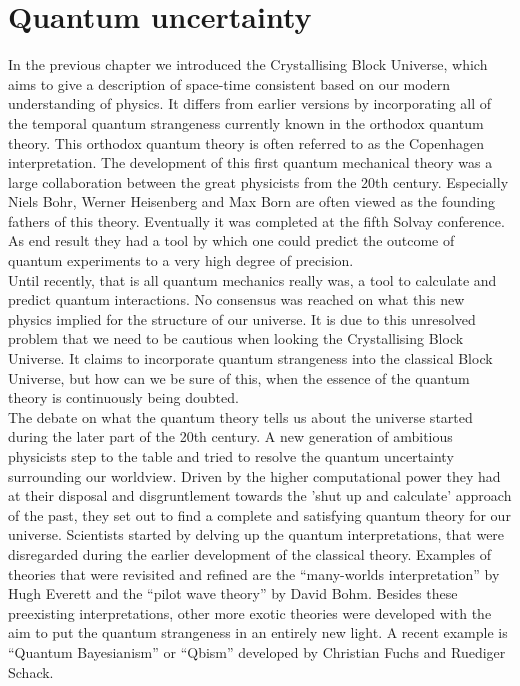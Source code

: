 \documentclass[11pt, a4 paper]{article}
\begin{document}
\section{Quantum uncertainty}
\begin{multicols}{2}
In the previous chapter we introduced the Crystallising Block Universe, which aims to give a description of space-time consistent based on our modern understanding of physics. It differs from earlier versions by incorporating all of the temporal quantum strangeness currently known in the orthodox quantum theory. This orthodox quantum theory is often referred to as the Copenhagen interpretation. The development of this first quantum mechanical theory was a large collaboration between the great physicists from the 20th century. Especially Niels Bohr, Werner Heisenberg and Max Born are often viewed as the founding fathers of this theory. Eventually it was completed at the fifth Solvay conference\cite{history}. As end result they had a tool by which one could predict the outcome of quantum experiments to a very high degree of precision.\\
Until recently, that is all quantum mechanics really was, a tool to calculate and predict quantum interactions. No consensus was reached on what this new physics implied for the structure of our universe. It is due to this unresolved problem that we need to be cautious when looking the Crystallising Block Universe. It claims to incorporate quantum strangeness into the classical Block Universe, but how can we be sure of this, when the essence of the quantum theory is continuously being doubted.\\
The debate on what the quantum theory tells us about the universe started during the later part of the 20th century. A new generation of ambitious physicists step to the table and tried to resolve the quantum uncertainty surrounding our worldview. Driven by the higher computational power they had at their disposal and disgruntlement towards the 'shut up and calculate' approach of the past, they set out to find a complete and satisfying quantum theory for our universe. Scientists started by delving up the quantum interpretations, that were disregarded during the earlier development of the classical theory. Examples of theories that were revisited and refined are the ``many-worlds interpretation'' by Hugh Everett and the ``pilot wave theory'' by David Bohm. Besides these preexisting interpretations, other more exotic theories were developed with the aim to put the quantum strangeness in an entirely new light. A recent example is ``Quantum Bayesianism'' or  ``Qbism'' developed by Christian Fuchs and Ruediger Schack\cite{Qbism1}\cite{Qbism2}\cite{Qbism3}.\\

\end{multicols}
\end{document}
